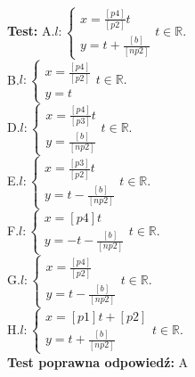 \documentclass[12pt, a4paper]{article}
\theoremstyle{definition} %
\newcommand{\testStart}{\noindent \textbf{Test:}\newline} %
\newcommand{\testStop}{\newline} %
\newcommand{\kluczStart}{\noindent \textbf{Test poprawna odpowiedź:}\newline} %
\newcommand{\kluczStop}{\newline} %
\begin{document}
\testStart
A.$l:\left\{ \begin{array}{ll}
x=\frac{[p4]}{[p2]}t\\
y=t+\frac{[b]}{[np2]}
\end{array}\right.  t\in\mathbb{R}.$\\
B.$l:\left\{ \begin{array}{ll}
x=\frac{[p4]}{[p2]}\\
y=t
\end{array}\right.  t\in\mathbb{R}.$\\
D.$l:\left\{ \begin{array}{ll}
x=\frac{[p4]}{[p3]}t\\
y=\frac{[b]}{[np2]}
\end{array}\right.  t\in\mathbb{R}.$\\
E.$l:\left\{ \begin{array}{ll}
x=\frac{[p3]}{[p2]}t\\
y=t-\frac{[b]}{[np2]}
\end{array}\right.  t\in\mathbb{R}.$\\
F.$l:\left\{ \begin{array}{ll}
x=[p4]t\\
y=-t-\frac{[b]}{[np2]}
\end{array}\right.  t\in\mathbb{R}.$\\
G.$l:\left\{ \begin{array}{ll}
x=\frac{[p4]}{[p2]}\\
y=t-\frac{[b]}{[np2]}
\end{array}\right.  t\in\mathbb{R}.$\\
H.$l:\left\{ \begin{array}{ll}
x=[p1]t+[p2]\\
y=t+\frac{[b]}{[np2]}
\end{array}\right.  t\in\mathbb{R}.$\\
\testStop
\kluczStart
A
\kluczStop
\end{document}
